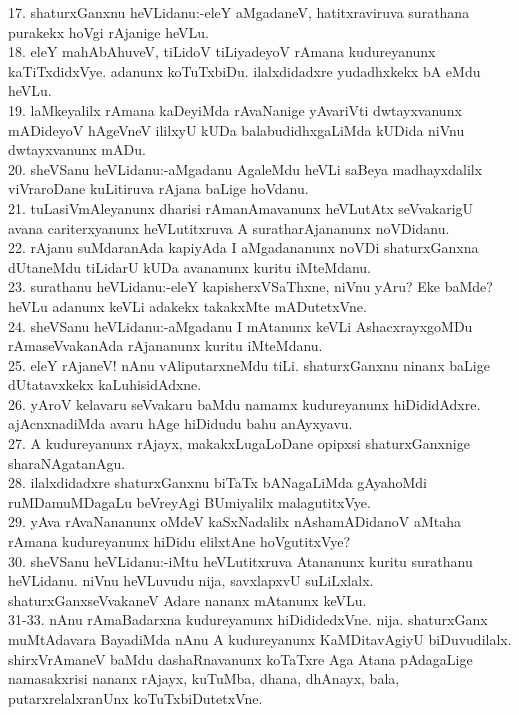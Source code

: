 \documentclass{article}
\begin{document}
17. shaturxGanxnu heVLidanu:-eleY aMgadaneV, hatitxraviruva surathana purakekx hoVgi rAjanige heVLu.\\
18. eleY mahAbAhuveV, tiLidoV tiLiyadeyoV rAmana kudureyanunx kaTiTxdidxVye. adanunx koTuTxbiDu. ilalxdidadxre yudadhxkekx bA eMdu heVLu.\\
19. laMkeyalilx rAmana kaDeyiMda rAvaNanige yAvariVti dwtayxvanunx mADideyoV hAgeVneV ililxyU kUDa balabudidhxgaLiMda kUDida niVnu dwtayxvanunx mADu.\\
20. sheVSanu heVLidanu:-aMgadanu AgaleMdu heVLi saBeya madhayxdalilx viVraroDane kuLitiruva rAjana baLige hoVdanu.\\
21. tuLasiVmAleyanunx dharisi rAmanAmavanunx heVLutAtx seVvakarigU avana cariterxyanunx heVLutitxruva A suratharAjananunx noVDidanu.\\
22. rAjanu suMdaranAda kapiyAda I aMgadananunx noVDi shaturxGanxna dUtaneMdu tiLidarU kUDa avananunx kuritu iMteMdanu.\\
23. surathanu heVLidanu:-eleY kapisherxVSaThxne, niVnu yAru? Eke baMde? heVLu adanunx keVLi adakekx takakxMte mADutetxVne.\\
24. sheVSanu heVLidanu:-aMgadanu I mAtanunx keVLi AshacxrayxgoMDu rAmaseVvakanAda rAjananunx kuritu iMteMdanu.\\
25. eleY rAjaneV! nAnu vAliputarxneMdu tiLi. shaturxGanxnu ninanx baLige dUtatavxkekx kaLuhisidAdxne.\\
26. yAroV kelavaru seVvakaru baMdu namamx kudureyanunx hiDididAdxre. ajAcnxnadiMda avaru hAge hiDidudu bahu anAyxyavu.\\
27. A kudureyanunx rAjayx, makakxLugaLoDane opipxsi shaturxGanxnige sharaNAgatanAgu.\\
28. ilalxdidadxre shaturxGanxnu biTaTx bANagaLiMda gAyahoMdi ruMDamuMDagaLu beVreyAgi BUmiyalilx malagutitxVye.\\
29. yAva rAvaNananunx oMdeV kaSxNadalilx nAshamADidanoV aMtaha rAmana kudureyanunx hiDidu elilxtAne hoVgutitxVye?\\
30. sheVSanu heVLidanu:-iMtu heVLutitxruva Atananunx kuritu surathanu heVLidanu. niVnu heVLuvudu nija, savxlapxvU suLiLxlalx. shaturxGanxseVvakaneV Adare nananx mAtanunx keVLu.\\
31-33. nAnu rAmaBadarxna kudureyanunx hiDididedxVne. nija. shaturxGanx muMtAdavara BayadiMda nAnu A kudureyanunx KaMDitavAgiyU biDuvudilalx. shirxVrAmaneV baMdu dashaRnavanunx koTaTxre Aga Atana pAdagaLige namasakxrisi nananx rAjayx, kuTuMba, dhana, dhAnayx, bala, putarxrelalxranUnx koTuTxbiDutetxVne.\\
\end{document}
